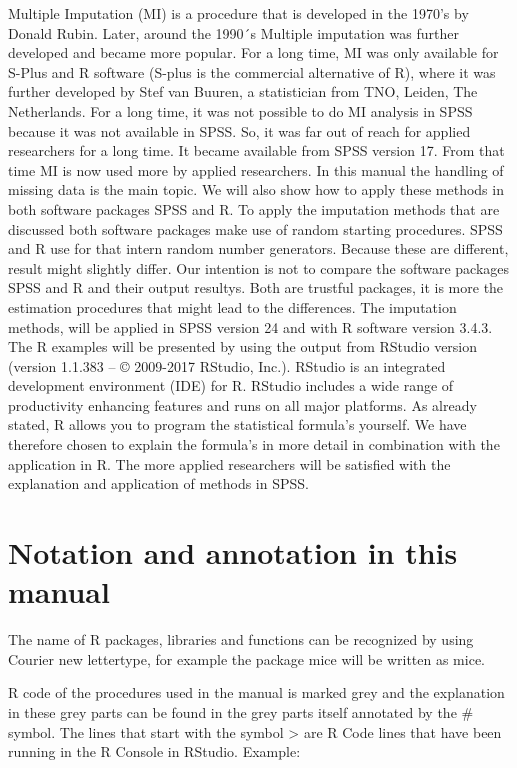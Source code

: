 \documentclass[]{book}
\begin{document}
Multiple Imputation (MI) is a procedure that is developed in the 1970's
by Donald Rubin. Later, around the 1990´s Multiple imputation was
further developed and became more popular. For a long time, MI was only
available for S-Plus and R software (S-plus is the commercial
alternative of R), where it was further developed by Stef van Buuren, a
statistician from TNO, Leiden, The Netherlands. For a long time, it was
not possible to do MI analysis in SPSS because it was not available in
SPSS. So, it was far out of reach for applied researchers for a long
time. It became available from SPSS version 17. From that time MI is now
used more by applied researchers. In this manual the handling of missing
data is the main topic. We will also show how to apply these methods in
both software packages SPSS and R. To apply the imputation methods that
are discussed both software packages make use of random starting
procedures. SPSS and R use for that intern random number generators.
Because these are different, result might slightly differ. Our intention
is not to compare the software packages SPSS and R and their output
resultys. Both are trustful packages, it is more the estimation
procedures that might lead to the differences. The imputation methods,
will be applied in SPSS version 24 and with R software version 3.4.3.
The R examples will be presented by using the output from RStudio
version (version 1.1.383 -- © 2009-2017 RStudio, Inc.). RStudio is an
integrated development environment (IDE) for R. RStudio includes a wide
range of productivity enhancing features and runs on all major
platforms. As already stated, R allows you to program the statistical
formula's yourself. We have therefore chosen to explain the formula's in
more detail in combination with the application in R. The more applied
researchers will be satisfied with the explanation and application of
methods in SPSS.

\section{Notation and annotation in this
manual}\label{notation-and-annotation-in-this-manual}

The name of R packages, libraries and functions can be recognized by
using Courier new lettertype, for example the package mice will be
written as mice.

R code of the procedures used in the manual is marked grey and the
explanation in these grey parts can be found in the grey parts itself
annotated by the \# symbol. The lines that start with the symbol
\textgreater{} are R Code lines that have been running in the R Console
in RStudio. Example:
\end{document}
